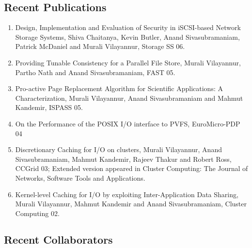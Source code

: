 \documentclass[11pt,fullpage]{article}
\begin{document}
{\begin{description}
\end{description}

\vspace*{-4mm}
\subsection*{Recent Publications}
\begin{enumerate}
\item Design, Implementation and Evaluation of Security in iSCSI-based Network Storage Systems,
Shiva Chaitanya, Kevin Butler, Anand Sivasubramaniam, Patrick McDaniel and Murali Vilayannur, Storage SS 06.
\item Providing Tunable Consistency for a Parallel File Store, 
Murali Vilayannur, Partho Nath and Anand Sivasubramaniam, FAST 05.
\item Pro-active Page Replacement Algorithm for Scientific Applications: A Characterization, 
Murali Vilayannur, Anand Sivasubramaniam and Mahmut Kandemir, ISPASS 05.
\item On the Performance of the POSIX I/O interface to PVFS, EuroMicro-PDP 04
\item Discretionary Caching for I/O on clusters, 
Murali Vilayannur, Anand Sivasubramaniam, Mahmut Kandemir, Rajeev Thakur and Robert Ross, CCGrid 03;
Extended version appeared in Cluster Computing: The Journal of Networks, Software Tools and Applications.
\item Kernel-level Caching for I/O by exploiting Inter-Application Data Sharing,
Murali Vilayannur, Mahmut Kandemir and Anand Sivasubramaniam, Cluster Computing 02.
\end{enumerate}

\vspace*{-4mm}



\vspace*{-4mm}
\subsection*{Recent Collaborators}

}
\end{document}
